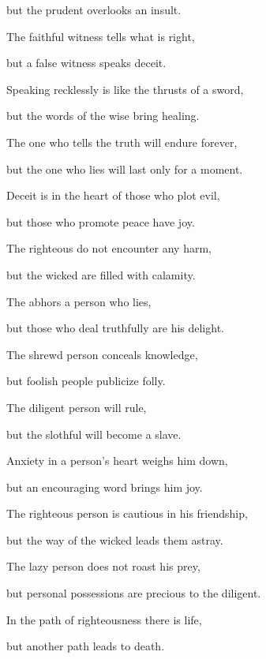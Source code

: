 {\par }{\Q but the prudent overlooks an insult.
\par }{\Q {}The faithful
witness
tells what is right,
\par }{\Q but a false
witness
speaks deceit.
\par }{\Q {}Speaking
recklessly
is like the thrusts
of a sword,
\par }{\Q but the words
of the wise
bring healing.
\par }{\Q {}The one who tells
the truth
will endure
forever,
\par }{\Q but the one who lies
will last only for a moment.
\par }{\Q {}Deceit
is in the heart
of those who plot
evil,
\par }{\Q but those who promote
peace
have joy.
\par }{\Q {}The righteous
do not
encounter
any
harm,
\par }{\Q but the wicked
are filled
with calamity.
\par }{\Q {}The
{}
abhors
a person who lies,
\par }{\Q but those who deal
truthfully
are his delight.
\par }{\Q {}The shrewd
person
conceals
knowledge,
\par }{\Q but foolish
people
publicize
folly.
\par }{\Q {}The diligent
person
will rule,
\par }{\Q but the slothful
will become
a slave.
\par }{\Q {}Anxiety
in a person’s
heart
weighs
him down,
\par }{\Q but an encouraging
word
brings him joy.
\par }{\Q {}The righteous
person is cautious
in his friendship,
\par }{\Q but the way
of the wicked
leads them astray.
\par }{\Q {}The lazy person
does not
roast
his prey,
\par }{\Q but personal possessions
are precious
to the diligent.
\par }{\Q {}In the path
of righteousness
there is life,
\par }{\Q but another path
leads
to death.

\par }
